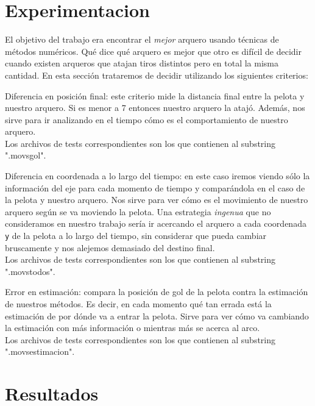 \section{Experimentacion}
El objetivo del trabajo era encontrar el \textit{mejor} arquero usando técnicas de métodos
numéricos. Qué dice qué arquero es mejor que otro es difícil de decidir cuando existen arqueros que
atajan tiros distintos pero en total la misma cantidad. En esta sección trataremos de decidir
utilizando los siguientes criterios:
\begin{compactitem}
  \item Diferencia en posición final: este criterio mide la distancia final entre la pelota y
    nuestro arquero. Si es menor a 7 entonces nuestro arquero la atajó. Además, nos sirve para ir
    analizando en el tiempo cómo es el comportamiento de nuestro arquero. \\
    Los archivos de tests correspondientes son los que contienen al substring ".movsgol".
  \item Diferencia en coordenada  a lo largo del tiempo: en este caso iremos viendo sólo la
    información del eje  para cada momento de tiempo y comparándola en el caso de la pelota
    y nuestro arquero. Nos sirve para ver cómo es el movimiento de nuestro arquero según se va
    moviendo la pelota. Una estrategia \textit{ingenua} que no consideramos en nuestro trabajo sería
    ir acercando el arquero a cada coordenada \texttt{y} de la pelota a lo largo del tiempo, sin
    considerar que pueda cambiar bruscamente y nos alejemos demasiado del destino final.
    \\
    Los archivos de tests correspondientes son los que contienen al substring ".movstodos".
  \item Error en estimación: compara la posición de gol de la pelota contra la estimación de
    nuestros métodos. Es decir, en cada momento qué tan errada está la estimación de por dónde va a
    entrar la pelota. Sirve para ver cómo va cambiando la estimación con más información o mientras
    más se acerca al arco.
    \\
    Los archivos de tests correspondientes son los que contienen al substring ".movsestimacion".
  \end{compactitem}


\section{Resultados}


